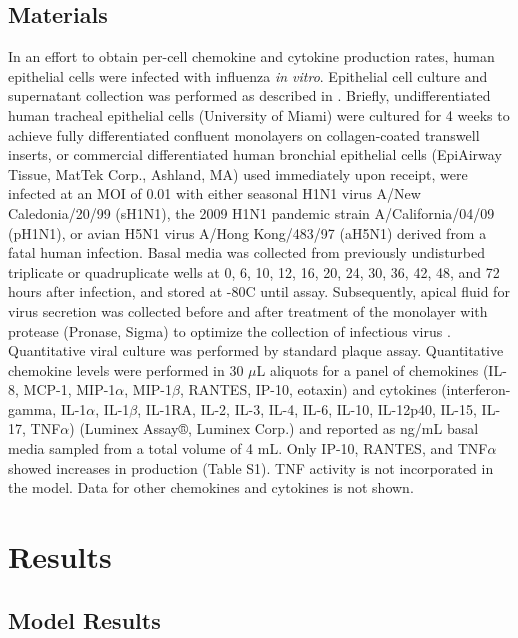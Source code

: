 \documentclass[10pt]{article}
\begin{document}
\subsection*{Materials}

In an effort to obtain per-cell chemokine and cytokine production rates, human epithelial cells were infected with influenza \textit{in vitro}.  Epithelial cell culture and supernatant collection was performed as described in \cite{Mitchell2011}.  Briefly, undifferentiated human tracheal epithelial cells (University of Miami) were cultured for 4 weeks to achieve fully differentiated confluent monolayers on collagen-coated transwell inserts, or commercial differentiated human bronchial epithelial cells (EpiAirway Tissue, MatTek Corp., Ashland, MA) used immediately upon receipt, were infected at an MOI of 0.01 with either seasonal H1N1 virus A/New Caledonia/20/99 (sH1N1), the 2009 H1N1 pandemic strain A/California/04/09 (pH1N1), or avian H5N1 virus A/Hong Kong/483/97 (aH5N1) derived from a fatal human infection.  Basal media was collected from previously undisturbed triplicate or quadruplicate wells at 0, 6, 10, 12, 16, 20, 24, 30, 36, 42, 48, and 72 hours after infection, and stored at -80C until assay.  Subsequently, apical fluid for virus secretion was collected before and after treatment of the monolayer with protease (Pronase, Sigma) to optimize the collection of infectious virus \cite{Mitchell2011}.  Quantitative viral culture was performed by standard plaque assay.  Quantitative chemokine levels were performed in 30 $\mu$L aliquots for a panel of chemokines (IL-8, MCP-1, MIP-1$\alpha$, MIP-1$\beta$, RANTES, IP-10, eotaxin) and cytokines (interferon-gamma, IL-1$\alpha$, IL-1$\beta$, IL-1RA, IL-2, IL-3, IL-4, IL-6, IL-10, IL-12p40, IL-15, IL-17, TNF$\alpha$) (Luminex Assay®, Luminex Corp.) and reported as ng/mL basal media sampled from a total volume of 4 mL.  Only IP-10, RANTES, and TNF$\alpha$ showed increases in production (Table S1).  TNF activity is not incorporated in the model.  Data for other chemokines and cytokines is not shown.



\section*{Results}

\subsection*{Model Results}
\end{document}
